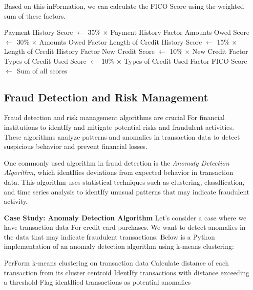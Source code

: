 \documentclass[12pt]{book} %
\begin{document}
Based on this inFormation, we can calculate the FICO Score using the weighted sum of these factors.
\FloatBarrier
\begin{algorithm}
\caption{FICO Score Calculation}
\begin{algorithmic}[1]
\State Payment History Score $\gets$ 35\% $\times$ Payment History Factor
\State Amounts Owed Score $\gets$ 30\% $\times$ Amounts Owed Factor
\State Length of Credit History Score $\gets$ 15\% $\times$ Length of Credit History Factor
\State New Credit Score $\gets$ 10\% $\times$ New Credit Factor
\State Types of Credit Used Score $\gets$ 10\% $\times$ Types of Credit Used Factor
\State FICO Score $\gets$ Sum of all scores
\end{algorithmic}
\end{algorithm}
\FloatBarrier

\subsection{Fraud Detection and Risk Management}
Fraud detection and risk management algorithms are crucial For financial institutions to identIfy and mitigate potential risks and fraudulent activities. These algorithms analyze patterns and anomalies in transaction data to detect suspicious behavior and prevent financial losses.

One commonly used algorithm in fraud detection is the \textit{Anomaly Detection Algorithm}, which identIfies deviations from expected behavior in transaction data. This algorithm uses statistical techniques such as clustering, classIfication, and time series analysis to identIfy unusual patterns that may indicate fraudulent activity.

\textbf{Case Study: Anomaly Detection Algorithm}
Let's consider a case where we have transaction data For credit card purchases. We want to detect anomalies in the data that may indicate fraudulent transactions. Below is a Python implementation of an anomaly detection algorithm using k-means clustering:
\FloatBarrier
\begin{algorithm}
\caption{Anomaly Detection Algorithm}
\begin{algorithmic}[1]
\State PerForm k-means clustering on transaction data
\State Calculate distance of each transaction from its cluster centroid
\State IdentIfy transactions with distance exceeding a threshold
\State Flag identIfied transactions as potential anomalies
\end{algorithmic}
\end{algorithm}
\FloatBarrier
\end{document}
